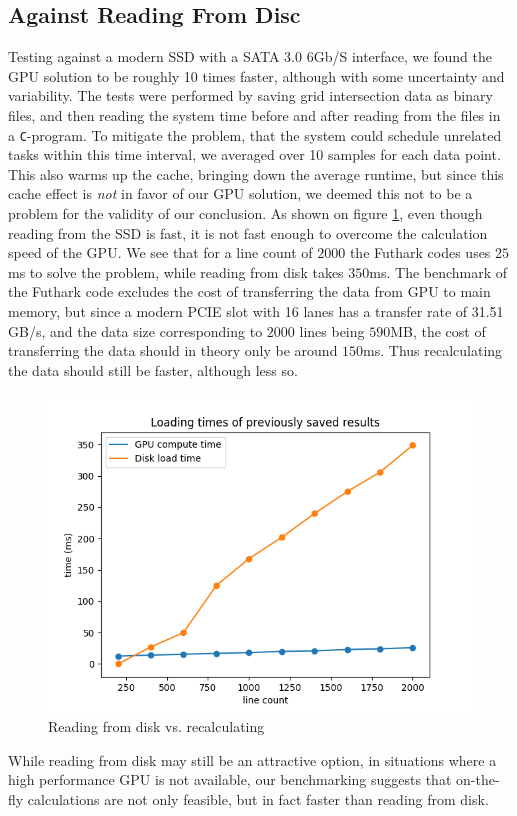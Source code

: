 \subsection{Against Reading From Disc}
Testing against a modern SSD with a SATA 3.0 6Gb/S interface, we found the GPU solution to be roughly 10 times faster, although with some uncertainty and variability. The tests were performed by saving grid intersection data as binary files, and then reading the system time before and after reading from the files in a \texttt{C}-program. To mitigate the problem, that the system could schedule unrelated tasks within this time interval, we averaged over 10 samples for each data point. This also warms up the cache, bringing down the average runtime, but since this cache effect is \textit{not} in favor of our GPU solution, we deemed this not to be a problem for the validity of our conclusion. As shown on figure \ref{fig:disk}, even though reading from the SSD is fast, it is not fast enough to overcome the calculation speed of the GPU. We see that for a line count of $2000$ the Futhark codes uses $25$ms to solve the problem, while reading from disk takes $350$ms. The benchmark of the Futhark code excludes the cost of transferring the  data from GPU to main memory, but since a modern PCIE slot with 16 lanes has a transfer rate of 31.51 GB/s, and the data size corresponding to $2000$ lines being $590$MB, the cost of transferring the data should in theory only be around $150$ms\cite{PCIE}. Thus recalculating the data should still be faster, although less so. 
\begin{figure}[H]
    \centering
    \captionsetup{justification=centering,margin=2cm}
    \includegraphics[scale=0.6]{figures/loadtime.png}
    \caption{Reading from disk vs. recalculating}\label{fig:disk}
\end{figure}
While reading from disk may still be an attractive option, in situations where a high performance GPU is not available, our benchmarking suggests that on-the-fly calculations are not only feasible, but in fact faster than reading from disk. 


